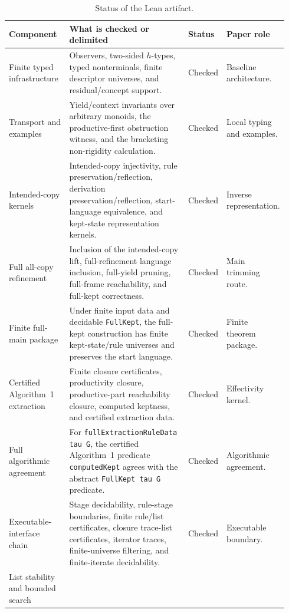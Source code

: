 \documentclass[sub]{jalc}
\begin{document}
\begin{table}[p]
\centering
\tiny
\setlength{\tabcolsep}{2pt}
\renewcommand{\arraystretch}{0.84}
\caption{Status of the Lean artifact.}
\label{tab:lean-checks}
\begin{tabular}{p{0.22\linewidth}p{0.45\linewidth}p{0.13\linewidth}p{0.14\linewidth}}
\hline
\textbf{Component} & \textbf{What is checked or delimited} & \textbf{Status} & \textbf{Paper role}\\
\hline
Finite typed infrastructure
& Observers, two-sided \(h\)-types, typed nonterminals, finite descriptor universes, and residual/concept support.
& Checked
& Baseline architecture.\\
\hline
Transport and examples
& Yield/context invariants over arbitrary monoids, the productive-first obstruction witness, and the bracketing non-rigidity calculation.
& Checked
& Local typing and examples.\\
\hline
Intended-copy kernels
& Intended-copy injectivity, rule preservation/reflection, derivation preservation/reflection, start-language equivalence, and kept-state representation kernels.
& Checked
& Inverse representation.\\
\hline
Full all-copy refinement
& Inclusion of the intended-copy lift, full-refinement language inclusion, full-yield pruning, full-frame reachability, and full-kept correctness.
& Checked
& Main trimming route.\\
\hline
Finite full-main package
& Under finite input data and decidable \texttt{FullKept}, the full-kept construction has finite kept-state/rule universes and preserves the start language.
& Checked
& Finite theorem package.\\
\hline
Certified Algorithm~1 extraction
& Finite closure certificates, productivity closure, productive-part reachability closure, computed keptness, and certified extraction data.
& Checked
& Effectivity kernel.\\
\hline
Full algorithmic agreement
& For \texttt{fullExtractionRuleData tau G}, the certified Algorithm~1 predicate \texttt{computedKept} agrees with the abstract \texttt{FullKept tau G} predicate.
& Checked
& Algorithmic agreement.\\
\hline
Executable-interface chain
& Stage decidability, rule-stage boundaries, finite rule/list certificates, closure trace-list certificates, iterator traces, finite-universe filtering, and finite-iterate decidability.
& Checked
& Executable boundary.\\
\hline
List stability and bounded search

\end{tabular}
\end{table}
\end{document}
